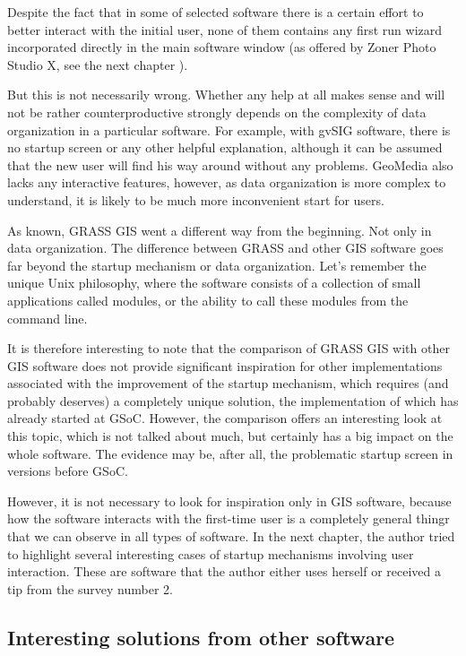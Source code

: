 \documentclass[a4paper,10pt,twoside]{article}
\begin{document}
Despite the fact that in some of selected software there is a certain effort to better interact with the initial user, none of them contains any first run wizard incorporated directly in the main software window (as offered by Zoner Photo Studio X, see the next chapter \label{sec:other_software}).

But this is not necessarily wrong. Whether any help at all makes sense and will not be rather counterproductive strongly depends on the complexity of data organization in a particular software. For example, with gvSIG software, there is no startup screen or any other helpful explanation, although it can be assumed that the new user will find his way around without any problems. GeoMedia also lacks any interactive features, however, as data organization is more complex to understand, it is likely to be much more inconvenient start for users.

As known, GRASS GIS went a different way from the beginning. Not only in data organization. The difference between GRASS and other GIS software goes far beyond the startup mechanism or data organization. Let's remember the unique Unix philosophy, where the software consists of a collection of small applications called modules, or the ability to call these modules from the command line.

It is therefore interesting to note that the comparison of GRASS GIS with other GIS software does not provide significant inspiration for other implementations associated with the improvement of the startup mechanism, which requires (and probably deserves) a completely unique solution, the implementation of which has already started at GSoC. However, the comparison offers an interesting look at this topic, which is not talked about much, but certainly has a big impact on the whole software. The evidence may be, after all, the problematic startup screen in versions before GSoC.

However, it is not necessary to look for inspiration only in GIS software, because how the software interacts with the first-time user is a completely general thingr that we can observe in all types of software. In the next chapter, the author tried to highlight several interesting cases of startup mechanisms involving user interaction. These are software that the author either uses herself or received a tip from the survey number 2.


\newpage
\vspace*{-1cm} 
\subsection{Interesting solutions from other software}
\end{document}
